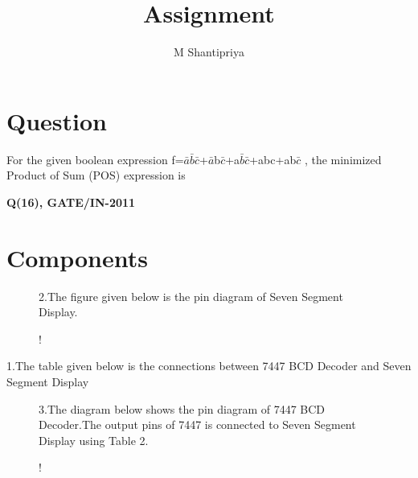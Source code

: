 \documentclass[journal,12pt,twocolumn]{IEEEtran}
\begin{document}
%

\theoremstyle{definition}
\newtheorem{theorem}{Theorem}[section]
\newtheorem{problem}{Problem}
\newtheorem{proposition}{Proposition}[section]
\newtheorem{lemma}{Lemma}[section]
\newtheorem{corollary}[theorem]{Corollary}
\newtheorem{example}{Example}[section]
\newtheorem{definition}{Definition}[section]
\newcommand{\BEQA}{\begin{eqnarray}}
\newcommand{\EEQA}{\end{eqnarray}}
\newcommand{\define}{\stackrel{\triangle}{=}}
\vspace{2cm}
\title{ 
Assignment
}

\author{M Shantipriya}


\maketitle
\tableofcontents
%
\section*{\textbf{Question}}

For the given boolean expression f=$\bar{a}$$\bar{b}$$\bar{c}$+$\bar{a}$b$\bar{c}$+a$\bar{b}$$\bar{c}$+abc+ab$\bar{c}$ , the minimized Product of Sum (POS) expression is\\
\begin{flushright}
\textbf{Q(16), GATE/IN-2011}
\end{flushright}

\section{\textbf{Components}}

\begin{table}[!h]
\centering
\caption{}
\label{table:7447_disp}
\end{table}


\begin{figure}[!h]
2.The figure given below is the pin diagram of Seven Segment Display.\\
\begin{center}
\resizebox {0.4\columnwidth} {!} {

}
\end{center}

\caption{}
\label{fig:sevenseg}
\end{figure}

\begin{table}[!h]
1.The table given below is the connections between 7447 BCD Decoder and Seven Segment Display\\
\centering

\caption{}
\label{table:7447_disp}
\end{table}
\begin{figure}[!h]
3.The diagram below shows the pin diagram of 7447 BCD Decoder.The output pins of 7447 is connected to Seven Segment Display using Table 2.
\begin{center}
\resizebox {1.2\columnwidth} {!} {

}
\end{center}
\caption{}
\label{fig:7447}
\end{figure}
\end{document}
